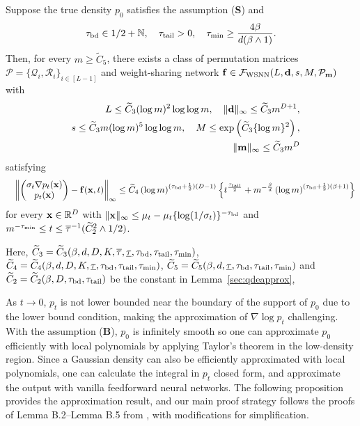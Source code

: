 \documentclass[twoside,11pt]{article}
\def\cF{\mathcal F}
\def\cP{\mathcal P}
\def\cQ{\mathcal Q}
\def\cR{\mathcal R}
\newcommand{\bB}{{\bf B}}
\newcommand{\bd}{{\bf d}}
\newcommand{\bff}{{\bf f}}
\newcommand{\bfm}{{\bf m}}
\newcommand{\bS}{{\bf S}}
\newcommand{\bx}{{\bf x}}
\newcommand{\bbR}{{\mathbb R}}
\newcommand{\bbN}{{\mathbb N}}
\newcommand{\bean}{\setlength\arraycolsep{1pt}\begin{eqnarray*}}
\newcommand{\eean}{\end{eqnarray*}}
\begin{document}
\begin{proposition}
\label{secpt:1}
Suppose the true density $p_0$ satisfies the assumption (\bS) and 
\bean
\tau_{\rm bd} \in 1/2 + \bbN,
\quad \tau_{\rm tail} > 0, 
\quad \tau_{\rm min} \geq \frac{4\beta}{d(\beta \wedge 1)}.
\eean
Then, for every $m \geq \widetilde C_{5}$, there exists a class of permutation matrices $\cP = \{ \cQ_{i}, \cR_{i} \}_{ i \in [L-1]}$ and weight-sharing  network $\bff \in \cF_{\rm WSNN}(L,\bd,s,M,\cP_{\bfm})$
with 
\bean
&& L \leq \widetilde C_{3} (\log m )^{2} \log \log m, \quad \|\bd\|_{\infty} \leq  \widetilde C_{3} m^{D+1},
\\
&& s \leq  \widetilde C_{3} m (\log m)^{5} \log \log m, \quad M \leq \exp \left(  \widetilde C_{3} \{ \log m \}^{2} \right), 
\\
&& \| \bfm \|_{\infty} \leq \widetilde C_{3} m^{D}
\eean
satisfying
\bean
&& \left\| \begin{pmatrix}
\sigma_t \nabla p_t(\bx) 
\\
 p_t(\bx)
\end{pmatrix}
-  \bff(\bx,t) \right\|_{\infty} \leq \widetilde C_{4} \left( \log m \right)^{(\tau_{\rm bd}+\frac{1}{2}) (D-1)  } \left\{
t^{\frac{\tau_{\rm tail}}{2}} + m^{-\frac{\beta}{d}} \left( \log m \right)^{(\tau_{\rm bd}+\frac{1}{2})(\beta + 1 )} \right\} 
\eean
for every $\bx \in \bbR^{D}$ with $\|\bx\|_{\infty} \leq \mu_t - \mu_t \{\log (1/\sigma_t)\}^{-\tau_{\rm bd}}$ and $m^{-\tau_{\rm min}} \leq t \leq \overline{\tau}^{-1} (\widetilde C_{2}^2 \wedge 1/2) $.

Here, $\widetilde C_{3} = \widetilde C_{3} ( \beta, d, D, K, \overline{\tau}, \underline{\tau}, \tau_{\rm bd}, \tau_{\rm tail}, \tau_{\rm min} )$, 
$\widetilde C_{4} = \widetilde C_{4} ( \beta, d, D, K, \underline{\tau}, \tau_{\rm bd}, \tau_{\rm tail}, \tau_{\rm min} )$,
$ \widetilde C_{5} = \widetilde C_{5} ( \beta, d, \underline{\tau}, \tau_{\rm bd}, \tau_{\rm tail}, \tau_{\min} )$
and
$\widetilde C_{2} = \widetilde C_{2}( \beta,D,\tau_{\rm bd},\tau_{\rm tail} )$ be the constant in Lemma~\ref{sec:qdeapprox}, 
\end{proposition}

\medskip

As $t \to 0$, $p_t$ is not lower bounded near the boundary of the support of $p_0$ due to the lower bound condition, making the approximation of $\nabla \log p_t$ challenging.
With the assumption (\bB), $p_0$ is infinitely smooth so one can approximate $p_0$ efficiently with local polynomials by applying Taylor's theorem in the low-density region.
Since a Gaussian density can also be efficiently approximated with local polynomials, one can calculate the integral in $p_t$ closed form, and approximate the output with vanilla feedforward neural networks.
The following proposition provides the approximation result, and our main proof strategy follows the proofs of Lemma B.2--Lemma B.5 from \citet{oko2023diffusion}, with modifications for simplification.
\end{document}
